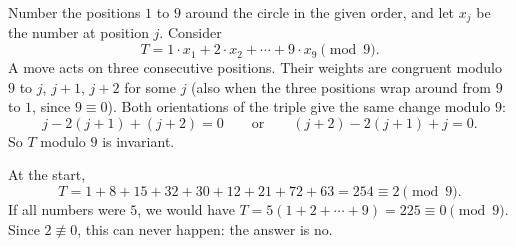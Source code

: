 Number the positions $1$ to $9$ around the circle in the given order, and let $x_j$ be the number at position $j$. Consider
\[
T=1\cdot x_1+2\cdot x_2+\cdots+9\cdot x_9 \pmod 9 .
\]
A move acts on three consecutive positions. Their weights are congruent modulo $9$ to $j$, $j+1$, $j+2$ for some $j$ (also when the three positions wrap around from $9$ to $1$, since $9\equiv0$). Both orientations of the triple give the same change modulo $9$:
\[
j-2(j+1)+(j+2)=0\qquad\text{or}\qquad (j+2)-2(j+1)+j=0 .
\]
So $T$ modulo $9$ is invariant.

At the start,
\[
T=1+8+15+32+30+12+21+72+63=254\equiv2\pmod9 .
\]
If all numbers were $5$, we would have $T=5(1+2+\cdots+9)=225\equiv0\pmod9$. Since $2\not\equiv0$, this can never happen: the answer is $\boxed{\text{no}}$.
